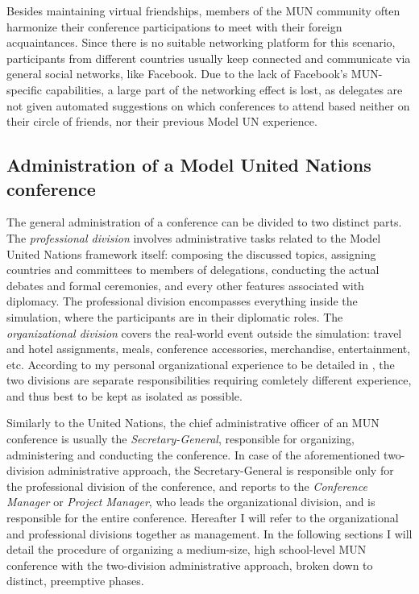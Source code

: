 Besides maintaining virtual friendships, members of the MUN community often harmonize their conference participations to meet with their foreign acquaintances. Since there is no suitable networking platform for this scenario, participants from different countries usually keep connected and communicate via general social networks, like Facebook. Due to the lack of Facebook's MUN-specific capabilities, a large part of the networking effect is lost, as delegates are not given automated suggestions on which conferences to attend based neither on their circle of friends, nor their previous Model UN experience.

\subsection{Administration of a Model United Nations conference}

The general administration of a conference can be divided to two distinct parts. The \emph{professional division} involves administrative tasks related to the Model United Nations framework itself: composing the discussed topics, assigning countries and committees to members of delegations, conducting the actual debates and formal ceremonies, and every other features associated with diplomacy. The professional division encompasses everything inside the simulation, where the participants are in their diplomatic roles. The \emph{organizational division} covers the real-world event outside the simulation: travel and hotel assignments, meals, conference accessories, merchandise, entertainment, etc. According to my personal organizational experience to be detailed in , the two divisions are separate responsibilities requiring comletely different experience, and thus best to be kept as isolated as possible.

Similarly to the United Nations, the chief administrative officer of an MUN conference is usually the \emph{Secretary-General}, responsible for organizing, administering and conducting the conference. In case of the aforementioned two-division administrative approach, the Secretary-General is responsible only for the professional division of the conference, and reports to the \emph{Conference Manager} or \emph{Project Manager}, who leads the organizational division, and is responsible for the entire conference. Hereafter I will refer to the organizational and professional divisions together as management. In the following sections I will detail the procedure of organizing a medium-size, high school-level MUN conference with the two-division administrative approach, broken down to distinct, preemptive phases.

